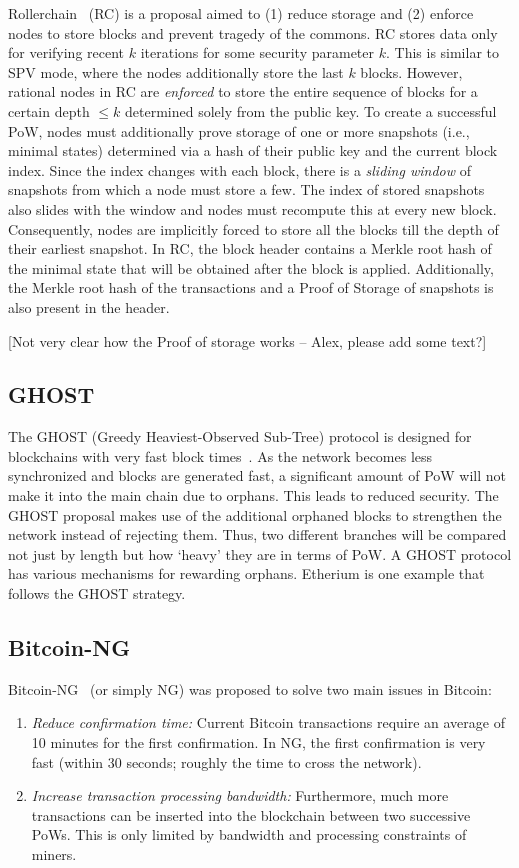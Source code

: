 \documentclass[]{report}   %
\begin{document}
Rollerchain~\cite{DBLP:journals/corr/ChepurnoyLO16} (RC) is a proposal aimed to (1) reduce storage and (2) enforce nodes to store blocks and prevent tragedy of the commons. RC stores data only for verifying recent $k$ iterations for some security parameter $k$. This is similar to SPV mode, where the nodes additionally store the last $k$ blocks. However, rational nodes in RC are {\em enforced} to store the entire sequence of blocks for a certain depth $\leq k$ determined solely from the public key. To create a successful PoW, nodes must additionally prove storage of one or more snapshots (i.e., minimal states) determined via a hash of their public key and the current block index. Since the index changes with each block, there is a {\em sliding window} of snapshots from which a node must store a few. The index of stored snapshots also slides with the window and nodes must recompute this at every new block. Consequently, nodes are implicitly forced to store all the blocks till the depth of their earliest snapshot.
In RC, the block header contains a Merkle root hash of the minimal state that will be obtained after the block is applied. Additionally, the Merkle root hash of the transactions and a Proof of Storage of snapshots is also present in the header. 

[Not very clear how the Proof of storage works -- Alex, please add some text?]


\subsection{GHOST}

The GHOST (Greedy Heaviest-Observed Sub-Tree) protocol is designed for blockchains with very fast block times~\cite{cryptoeprint:2013:881}. As the network becomes less synchronized and blocks are generated fast, a significant amount of PoW will not make it into the main chain due to orphans. This leads to reduced security. The GHOST proposal makes use of the additional orphaned blocks to strengthen the network instead of rejecting them. Thus, two different branches will be compared not just by length but how `heavy' they are in terms of PoW. A GHOST protocol has various mechanisms for rewarding orphans. Etherium is one example that follows the GHOST strategy.

\subsection{Bitcoin-NG}

Bitcoin-NG~\cite{eyal2016bitcoin} (or simply NG) was proposed to solve two main issues in Bitcoin:
\begin{enumerate}
	\item {\em Reduce confirmation time:} Current Bitcoin transactions require an average of 10 minutes for the first confirmation. In NG, the first confirmation is very fast (within 30 seconds; roughly the time to cross the network). 
	\item {\em Increase transaction processing bandwidth:} Furthermore, much more transactions can be inserted into the blockchain between two successive PoWs. This is only limited by bandwidth and processing constraints of miners.
\end{enumerate}
\end{document}

